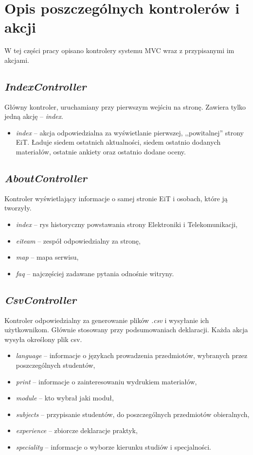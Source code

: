 \documentclass[a4paper,12pt,oneside]{report}
\begin{document}
\section{Opis poszczególnych kontrolerów i akcji}
\label{sec:kontrolery}

W tej części pracy opisano kontrolery systemu MVC wraz z przypisanymi im akcjami.

\subsection{\emph{IndexController}}
\label{con:index}
  Główny kontroler, uruchamiany przy pierwszym wejściu na stronę. Zawiera tylko jedną akcję -- \emph{index}.
\begin{itemize}
  \item \emph{index} -- akcja odpowiedzialna za wyświetlanie pierwszej, ,,powitalnej'' strony EiT. Ładuje siedem ostatnich aktualności, siedem ostatnio dodanych materiałów, ostatnie ankiety oraz ostatnio dodane oceny. 
\end{itemize}

\subsection{\emph{AboutController}}
\label{con:about}
  Kontroler wyświetlający informacje o samej stronie EiT i osobach, które ją tworzyły.
\begin{itemize}
  \item \emph{index} -- rys historyczny powstawania strony Elektroniki i Telekomunikacji,
  \item \emph{eiteam} -- zespół odpowiedzialny za stronę,
  \item \emph{map} -- mapa serwisu,
  \item \emph{faq} -- najczęściej zadawane pytania odnośnie witryny.
\end{itemize}

\subsection{\emph{CsvController}}
\label{con:csv}
  Kontroler odpowiedzialny za generowanie plików \emph{.csv} i wysyłanie ich użytkownikom. Głównie stosowany przy podsumowaniach deklaracji. Każda akcja wysyła określony plik csv.
\begin{itemize}
  \item \emph{language} -- informacje o językach prowadzenia przedmiotów, wybranych przez poszczególnych studentów,
  \item \emph{print} -- informacje o zainteresowaniu wydrukiem materiałów,
  \item \emph{module} -- kto wybrał jaki moduł,
  \item \emph{subjects} -- przypisanie studentów, do poszczególnych przedmiotów obieralnych,
  \item \emph{experience} -- zbiorcze deklaracje praktyk,
  \item \emph{speciality} -- informacje o wyborze kierunku studiów i specjalności.
\end{itemize}
\end{document}
